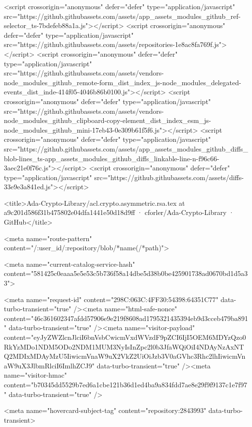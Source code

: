 <script crossorigin="anonymous" defer="defer" type="application/javascript" src="https://github.githubassets.com/assets/app_assets_modules_github_ref-selector_ts-7bdefeb88a1a.js"></script>
<script crossorigin="anonymous" defer="defer" type="application/javascript" src="https://github.githubassets.com/assets/repositories-1e8ac8fa769f.js"></script>
<script crossorigin="anonymous" defer="defer" type="application/javascript" src="https://github.githubassets.com/assets/vendors-node_modules_github_remote-form_dist_index_js-node_modules_delegated-events_dist_inde-414f05-4046b86b0100.js"></script>
<script crossorigin="anonymous" defer="defer" type="application/javascript" src="https://github.githubassets.com/assets/vendors-node_modules_github_clipboard-copy-element_dist_index_esm_js-node_modules_github_mini-17eb43-0e309b61f5f6.js"></script>
<script crossorigin="anonymous" defer="defer" type="application/javascript" src="https://github.githubassets.com/assets/app_assets_modules_github_diffs_blob-lines_ts-app_assets_modules_github_diffs_linkable-line-n-f96c66-3aec21e0f76c.js"></script>
<script crossorigin="anonymous" defer="defer" type="application/javascript" src="https://github.githubassets.com/assets/diffs-33e9e3a841ed.js"></script>
  

  <title>Ada-Crypto-Library/acl.crypto.asymmetric.rsa.tex at a9c201d586f31b475802e04dfa1441e50d18d9ff · cforler/Ada-Crypto-Library · GitHub</title>



  <meta name="route-pattern" content="/:user_id/:repository/blob/*name(/*path)">

    
  <meta name="current-catalog-service-hash" content="581425c0eaaa5e5e53c5b736f58a14dbe5d38b0be425901738ad0670bd1d5a33">


  <meta name="request-id" content="298C:063C:4FF30:54398:64351C77" data-turbo-transient="true" /><meta name="html-safe-nonce" content="46c361602347afdd57906e9e219f8608ad1795321435394eb9d3cceb479ba891" data-turbo-transient="true" /><meta name="visitor-payload" content="eyJyZWZlcnJlciI6bnVsbCwicmVxdWVzdF9pZCI6IjI5OEM6MDYzQzo0RkYzMDo1NDM5ODo2NDM1MUM3NyIsInZpc2l0b3JfaWQiOiI4NDAyNzAxNTQ2MDIxMDAyMzU5IiwicmVnaW9uX2VkZ2UiOiJzb3V0aGVhc3Rhc2lhIiwicmVnaW9uX3JlbmRlciI6ImlhZCJ9" data-turbo-transient="true" /><meta name="visitor-hmac" content="b70345dd5529b7ed6a1cbe121b36d1ed4ba9a834fdd7ae8e29f9f9137c1e7f97" data-turbo-transient="true" />


    <meta name="hovercard-subject-tag" content="repository:2843993" data-turbo-transient>



